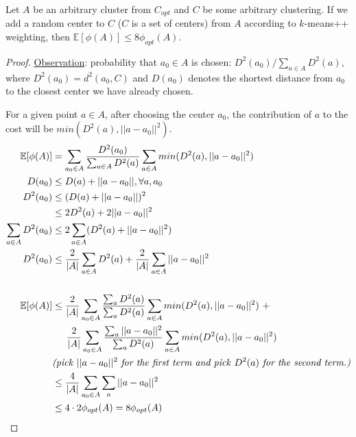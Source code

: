 \begin{lemma}
  Let $A$ be an arbitrary cluster from $C_{opt}$ and $C$ be some
  arbitrary clustering. If we add a random center to $C$ ($C$ is a set
  of centers) from $A$ according to $k$-means++ weighting, then
  $\mathbb{E}[\phi(A)]\leq 8\phi_{opt}(A)$. 
\end{lemma}

\begin{proof}
  \underline{Observation}: probability that $a_0\in A$ is chosen:
  $D^2(a_0)/\sum_{a\in A}D^2(a)$, where $D^2(a_0)= d^2(a_0,C)$ and
  $D(a_0)$ denotes the shortest distance from $a_0$ to the closest
  center we have already chosen.
  
  For a given point $a\in A$, after choosing the center $a_0$, the
  contribution of $a$ to the cost will be $min(D^2(a),
  ||a-a_0||^2)$.\\ 
  \begin{align*}
    \mathbb{E}[\phi(A)] &= \sum_{a_0\in A}\frac{D^2(a_0)}{\sum_{a\in
        A}D^2(a)}\sum_{a\in A} min(D^2(a), ||a-a_0||^2)    \\
    D(a_0)&\leq D(a)+||a-a_0||, \forall a,a_0\\
    D^2(a_0)&\leq (D(a)+||a-a_0||)^2\\
    &\leq 2D^2(a)+2||a-a_0||^2\\
    \sum_{a\in A}D^2(a_0)&\leq 2\sum_{a\in A}(D^2(a)+||a-a_0||^2)\\ 
    D^2(a_0)&\leq \frac{2}{|A|}\sum_{a\in
      A}D^2(a)+\frac{2}{|A|}\sum_{a\in A}||a-a_0||^2\\\\ 
    \mathbb{E}[\phi(A)] &\leq \frac{2}{|A|}\sum_{a_0\in
      A}\frac{\sum_{a}D^2(a)}{\sum_{a}D^2(a)}\sum_{a\in A} min(D^2(a),
    ||a-a_0||^2)\ + \\ 
    &\hspace{1.5em} \frac{2}{|A|}\sum_{a_0\in
      A}\frac{\sum_{a}||a-a_0||^2}{\sum_{a}D^2(a)}\sum_{a\in A}
    min(D^2(a), ||a-a_0||^2)\\ 
    &\text{\textit{(pick}}\ ||a-a_0||^2\ \text{\textit{for the first
        term and pick}}\ D^2(a)\ \text{\textit{for the second
        term.)}}\\ 
    &\leq \frac{4}{|A|}\sum_{a_0\in A}\sum_{a}||a-a_0||^2\\
    &\leq 4\cdot 2\phi_{opt}(A)=8\phi_{opt}(A)
  \end{align*}	
\end{proof}

